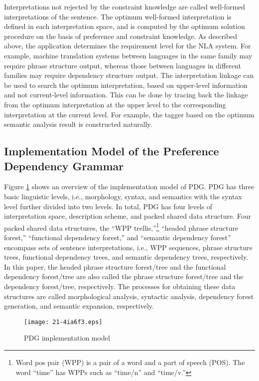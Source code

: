 \documentclass[english]{jnlp_1.4_rep}
\theoremstyle{break}
\theoremstyle{plain}
\theoremstyle{plain}
\begin{document}
\noindent
Interpretations not rejected by the constraint knowledge
are called well-formed interpretations of the sentence. The optimum
well-formed interpretation is defined in each interpretation space,
and is computed by the optimum solution procedure on the basis of
preference and constraint knowledge. As described above, the
application determines the requirement level for the NLA system. For
example, machine translation systems between languages in the same
family may require phrase structure output, whereas those between
languages in different families may require dependency structure
output. The interpretation linkage can be used to search the optimum
interpretation, based on upper-level information and not current-level
information. This can be done by tracing back the linkage from the
optimum interpretation at the upper level to the corresponding
interpretation at the current level. For example, the tagger based on
the optimum semantic analysis result is constructed naturally.


\subsection{Implementation Model of the Preference Dependency Grammar}
\label{sec:OverviewPDG}

Figure \ref{fig:PDGAnalysisModel} shows an overview of the implementation
model of PDG. PDG has three basic linguistic levels, i.e., morphology,
syntax, and semantics with the syntax level further divided into two
levels. In total, PDG has four levels of interpretation space,
description scheme, and packed shared data structure. Four packed
shared data structures, the ``WPP trellis,''\footnote{Word pos pair
 (WPP) is a pair of a word and a part of speech (POS). The word
  ``time'' has WPPs such as ``time/n'' and ``time/v.''} ``headed
phrase structure forest,'' ``functional dependency forest,'' and
``semantic dependency forest'' encompass sets of sentence
interpretations, i.e., WPP sequences, phrase structure trees,
functional dependency trees, and semantic dependency trees,
respectively.  In this paper, the headed phrase structure forest/tree
and the functional dependency forest/tree are also called the phrase
structure forest/tree and the dependency forest/tree,
respectively. The processes for obtaining these data structures are
called morphological analysis, syntactic analysis, dependency forest
generation, and semantic expansion, respectively.

\begin{figure}[b]
\texttt{[image: 21-4ia6f3.eps]}
\caption{PDG implementation model}
\label{fig:PDGAnalysisModel}
\vspace*{-0.3\Cvs}
\end{figure}
\end{document}
